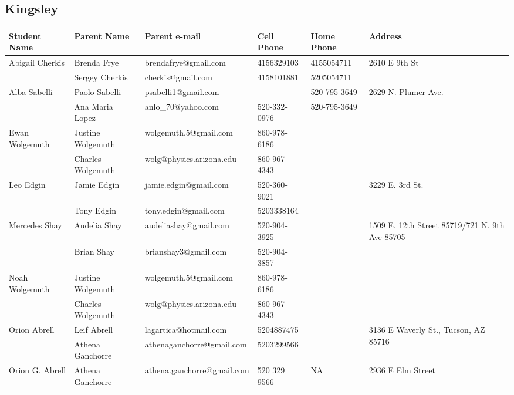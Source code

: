 \documentclass[landscape]{article}\usepackage[]{graphicx}\usepackage[]{color}
\begin{document}
\newpage
\subsection{Kingsley}
\begin{longtable}{|p{100pt}|p{100pt}|p{140pt}|p{60pt}|p{64pt}|p{120pt}|}
\textbf{Student Name} & \textbf{Parent Name} & \textbf{Parent e-mail} & \textbf{Cell Phone} & \textbf{Home Phone} & \textbf{Address}\\
\hline
\hline
\multirow{2}{100pt}{Abigail Cherkis} & Brenda Frye & brendafrye@gmail.com & 4156329103 & 4155054711 & \multirow{2}{120pt}{2610 E 9th St} \\
 & Sergey Cherkis & cherkis@gmail.com & 4158101881 & 5205054711 & \\
\hline
\multirow{2}{100pt}{Alba Sabelli} & Paolo Sabelli & psabelli1@gmail.com &  & 520-795-3649 & \multirow{2}{120pt}{2629 N. Plumer Ave.} \\
 & Ana Maria Lopez & anlo\_70@yahoo.com & 520-332-0976 & 520-795-3649 & \\
\hline
\multirow{2}{100pt}{Ewan Wolgemuth} & Justine Wolgemuth & wolgemuth.5@gmail.com & 860-978-6186 &  & \multirow{2}{120pt}{} \\
 & Charles Wolgemuth & wolg@physics.arizona.edu & 860-967-4343 &  & \\
\hline
\multirow{2}{100pt}{Leo Edgin} & Jamie Edgin & jamie.edgin@gmail.com & 520-360-9021 &  & \multirow{2}{120pt}{3229 E. 3rd St.} \\
 & Tony Edgin & tony.edgin@gmail.com & 5203338164 &  & \\
\hline
\multirow{2}{100pt}{Mercedes Shay} & Audelia Shay  & audeliashay@gmail.com & 520-904-3925 &  & \multirow{2}{120pt}{1509 E. 12th Street 85719/721 N. 9th Ave 85705} \\
 & Brian Shay & brianshay3@gmail.com & 520-904-3857 &  & \\
\hline
\multirow{2}{100pt}{Noah Wolgemuth} & Justine Wolgemuth & wolgemuth.5@gmail.com & 860-978-6186 &  & \multirow{2}{120pt}{} \\
 & Charles Wolgemuth & wolg@physics.arizona.edu & 860-967-4343 &  & \\
\hline
\multirow{2}{100pt}{Orion Abrell} & Leif Abrell & lagartica@hotmail.com & 5204887475 &  & \multirow{2}{120pt}{3136 E Waverly St., Tucson, AZ 85716} \\
 & Athena Ganchorre & athenaganchorre@gmail.com & 5203299566 &  & \\
\hline
\multirow{2}{100pt}{Orion G. Abrell} & Athena Ganchorre & athena.ganchorre@gmail.com & 520 329 9566 & NA & \multirow{2}{120pt}{2936 E Elm Street} \\

\end{longtable}
\end{document}
